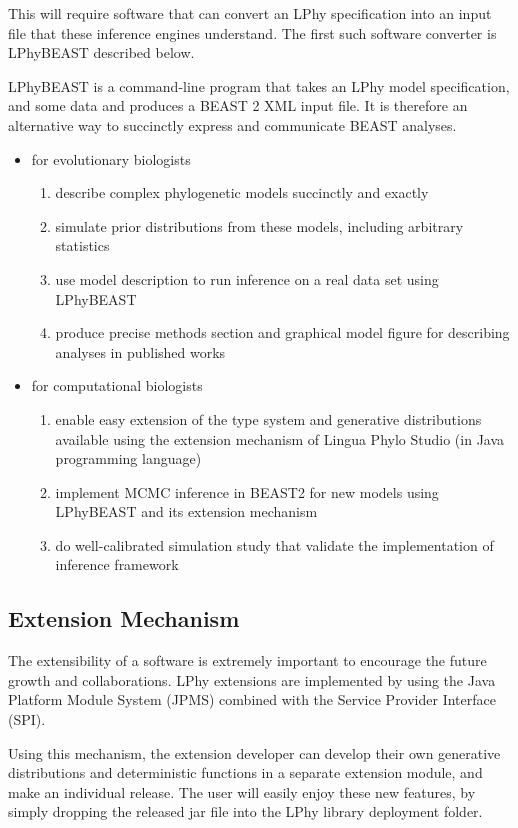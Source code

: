 \documentclass[10pt,letterpaper,table]{article}
\begin{document}
{This will require software that can convert an LPhy specification into
an input file that these inference engines understand.
The first such software converter is LPhyBEAST described below.


LPhyBEAST is a command-line program that takes an LPhy model
specification, and some data and produces a BEAST 2 XML input file.
It is therefore an alternative way to succinctly express and
communicate BEAST analyses.

\begin{itemize}
\item for evolutionary biologists
\begin{enumerate}
\item describe complex phylogenetic models succinctly and exactly
\item simulate prior distributions from these models, including arbitrary statistics
\item use model description to run inference on a real data set using LPhyBEAST
\item produce precise methods section and graphical model figure for describing analyses in published works
\end{enumerate}
\item for computational biologists
\begin{enumerate}
\item enable easy extension of the type system and generative distributions available using the extension mechanism of Lingua Phylo Studio (in Java programming language)
\item implement MCMC inference in BEAST2 for new models using LPhyBEAST and its extension mechanism
\item do well-calibrated simulation study that validate the implementation of inference framework
\end{enumerate}
\end{itemize}


\subsection{Extension Mechanism}
The extensibility of a software is extremely important to encourage the future growth and collaborations. 
LPhy extensions are implemented by using the Java Platform Module System (JPMS) combined with the Service Provider Interface (SPI).

Using this mechanism, the extension developer can develop their own generative distributions and deterministic functions in a separate extension module, and make an individual release.
The user will easily enjoy these new features, by simply dropping the released jar file into the LPhy library deployment folder.

}
\end{document}
